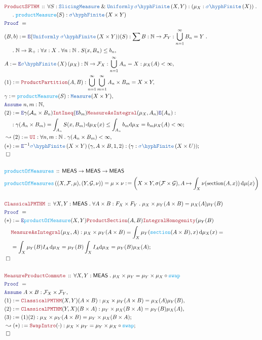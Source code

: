 \documentclass[12pt]{scrartcl}
\newcommand{\TYPE}[1]{\textcolor{NavyBlue}{\mathtt{#1}}}
\newcommand{\FUNC}[1]{\textcolor{Cerulean}{\mathtt{#1}}}
\newcommand{\LOGIC}[1]{\textcolor{Blue}{\mathtt{#1}}}
\newcommand{\THM}[1]{\textcolor{Maroon}{\mathtt{#1}}}
\renewcommand{\.}{\; . \;}
\newcommand{\de}{: \kern 0.1pc =}
\newcommand{\Act}[1]{\left( #1 \right)}
\newcommand{\Theorem}[2]{& \THM{#1} \, :: \, #2 \\ & \Proof = \\ }
\newcommand{\DeclareFunc}[2]{& \FUNC{#1} \, :: \, #2 \\}
\newcommand{\DefineNamedFunc}[4]{&  \FUNC{#1}\Act{#2} = #3 \de #4 \\}
\newcommand{\NewLine}{\\ & \kern 1pc}
\newcommand{\Page}[1]{ \begin{align*} #1 \end{align*}   }
\renewcommand{\And}{\; \& \;}
\newcommand{\ForEach}[3]{\forall #1 : #2 \. #3 }
\newcommand{\Reals}{\mathbb{R} }
\newcommand{\Nat}{\mathbb{N} }
\newcommand{\Say}[3]{& #1 \de #2 : #3, \\}
\newcommand{\Conclude}[3]{& #1 \de #2 : #3; \\}
\newcommand{\Derive}[3]{& \leadsto #1 \de #2 : #3, \\}
\newcommand{\DeriveConclude}[3]{& \leadsto #1 \de #2 : #3 ; \\}
\newcommand{\Assume}[2]{& \LOGIC{Assume} \; #1 : #2, \\}
\newcommand{\ByDef}{\LOGIC{E}}
\newcommand{\QED}{\; \square}
\newcommand{\EndProof}{& \QED \\}
\newcommand{\Proof}{\LOGIC{Proof} \; }
\newcommand{\A}{\mathcal{A}}
\newcommand{\SF}[1]{\TYPE{\sigma \hyph  Finite}\left( #1 \right) }
\newcommand{\F}{\mathcal{F}}
\newcommand{\MEAS}{\mathsf{MEAS}}
\begin{document}
\Page{
\Theorem{ProductSFTHM}
{ 
\forall S : \TYPE{SlicingMeasure} \And \TYPE{Uniformly}  \, \SF{X,Y} : (\mu_X : \SF{X}) \. \NewLine   
 \. \FUNC{productMeasure}(S) : \SF{X \times Y} 
}
\Say{(B,b)}{\ByDef(\TYPE{Uniformly} \; \SF{X \times Y})(S)}{ \sum B : \Nat \to \F_Y : \bigcup^\infty_{n = 1} B_n = Y \.\NewLine \. \Nat \to \Reals_+ : 
 \ForEach{x}{X}{ \ForEach{n}{\Nat}{  S(x,B_n) \le b_n }}}
\Say{A}{\ByDef \SF{X}(\mu_X)}{ \Nat \to \F_X : \bigcup^\infty_{n = 1} A_n = X : \mu_X(A) < \infty }
\Say{(1)}{\THM{ProductPartition}(A,B)}{\bigcup_{n =1}^\infty \bigcup^\infty_{m = 1} A_n \times B_m = X \times Y }
\Say{\gamma}{\FUNC{productMeasure}(S)}{\TYPE{Measure}(X \times Y)}
\Assume{n,m}{\Nat}
\Conclude{(2)}{\ByDef\gamma(\A_n \times B_n) \THM{IntIneq}(\ByDef b_m)\THM{MeasureAsIntegral}(\mu_X,A_n)\ByDef(A_n) : \NewLine }
{\gamma(A_n \times B_m) = \int_{A_n} S(x, B_m) \, \mathrm{d} \mu_X(x) \le \int_{A_n} b_m \mathrm{d} \mu_X = b_m \mu_X(A) < \infty} 
\Derive{(2)}{ \THM{UI} }{\ForEach{n,m}{\Nat}{\gamma(A_n \times B_m) < \infty}}
\Conclude{(*)}{ \ByDef^{-1} \SF{X \times Y}(\gamma,A \times B,1,2)}{(\gamma : \SF{X \times U})}
\EndProof
\\
\DeclareFunc{productOfMeasures}{ \MEAS \to \MEAS  \to \MEAS}
\DefineNamedFunc{productOfMeasures}{(X,\F,\mu),(Y,\mathcal{G},\nu) }{ \mu \times \nu }{ \Act{X \times Y, \sigma(\F \times \mathcal{G}), A \mapsto \int_X \nu(\mathrm{section}(A,x)) \, \mathrm{d}\mu(x)} }
\\
\Theorem{ClassicalPMTHM}{
\ForEach{X,Y}{\MEAS}{
\ForEach{A \times B }{ F_X \times F_Y}{ \mu_X \times \mu_Y (A \times B ) = \mu_X( A  )\mu_Y( B) }
}}
\Conclude{(*)}{\ByDef\FUNC{productOfMeasure}(X,Y)\THM{ProductSection}(A,B)\THM{IntegralHomogenity}(\mu_Y(B) \NewLine \THM{MeasureAsIntegral}(\mu_X,A) }
{  \mu_X \times \mu_Y(A \times B) = \int_X \mu_Y(\FUNC{section}(A \times B), x )\, \mathrm{d}\mu_X(x) =
\NewLine
= \int_X \mu_Y(B)I_A \, \mathrm{d}\mu_X 
 = \mu_Y(B) \int_X I_A \mathrm{d}\mu_X  = \mu_Y(B) \mu_X(A) 
}
\EndProof
\\
\Theorem{MeasureProductCommute}{
\ForEach{X,Y}{\MEAS}{ \mu_X \times \mu_Y = \mu_Y \times \mu_X \circ \FUNC{swap} }
}
\Assume{A \times B}{\F_X \times \F_Y}
\Say{ (1) }{\THM{ClassicalPMTHM}(X,Y)(A \times B)}{ \mu_X \times \mu_Y(A \times B) = \mu_X(A)\mu_Y(B) }
\Say{(2)}{\THM{ClassicalPMTHM}(Y,X)(B \times A)}{ \mu_Y \times \mu_X(B \times A) = \mu_Y(B)\mu_X(A) }
\Conclude{(3)}{(1)(2)}{ \mu_X \times \mu_Y (A \times B) = \mu_Y \times \mu_X (B \times A)}
\DeriveConclude{(*)}{\THM{SwapIntro}(\cdot)}{\mu_X \times \mu_Y = \mu_Y \times \mu_X \circ \FUNC{swap}}
\EndProof
}
\newpage
\end{document}
